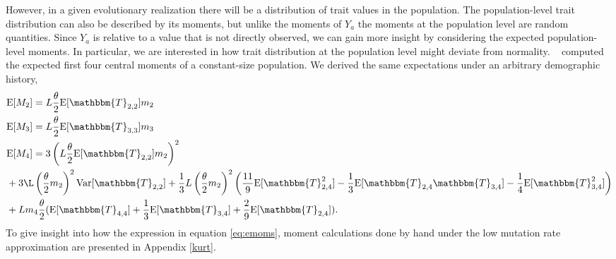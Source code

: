 However, in a given evolutionary realization there will be a distribution of
trait values in the population. The population-level trait distribution can also
be described by its moments, but unlike the moments of $Y_a$ the moments at the
population level are random quantities. Since $Y_a$ is relative to a value that
is not directly observed, we can gain more insight by considering the expected
population-level moments. In particular, we are interested in how trait
distribution at the population level might deviate from normality.
~\citet{Schraiber2015} computed the expected first four central moments of a
constant-size population. We derived the same expectations under an arbitrary
demographic history,
\begin{subequations} \label{eq:emoms}
\begin{align}
  &\E[M_2] = L \T \E[\mathbbm{T}_{2,2}] m_2 \label{eq:emoms2}\\
  &\E[M_3] = L \T \E[\mathbbm{T}_{3,3}] m_3  \label{eq:emoms3}\\
  &\E[M_4] = 3\left(L \T \E[\mathbbm{T}_{2,2}] m_2\right)^2 \nonumber \\
  &+ 3\L \left(\T m_2\right)^2\Var[\mathbbm{T}_{2,2}] + \frac{1}{3}
  L \left(\T m_2\right)^2
    \left( \frac{11}{9} \E[\mathbbm{T}_{2,4}^2]-\frac{1}{3}\E[\mathbbm{T}_{2,4}\mathbbm{T}_{3,4}]-
    \frac{1}{4}\E[\mathbbm{T}_{3,4}^2]\right) \nonumber \\
  &+ L m_4 \T ( \E[\mathbbm{T}_{4,4}] + \frac{1}{3} \E[\mathbbm{T}_{3,4}] +
    \frac{2}{9} \E[\mathbbm{T}_{2,4}] ).
  \label{eq:emoms4}
\end{align}
\end{subequations}
To give insight into how the expression in equation \eqref{eq:emoms}, moment
calculations done by hand under the low mutation rate approximation are
presented in Appendix \ref{kurt}.


